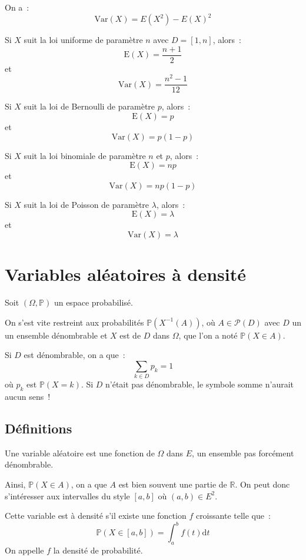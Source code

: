 \documentclass[a4paper, titlepage]{article}
\begin{document}
	\begin{props}
		On a~:
		$$ \mathrm{Var}(X) = E(X^2) - E(X)^2 $$
	\end{props}

	\begin{thm}
		Si $X$ suit la loi uniforme de paramètre $n$ avec $D=[1,n]$, alors~:
		$$ \mathrm{E}(X) = \frac{n+1}{2} $$
		et
		$$ \mathrm{Var}(X) = \frac{n^2-1}{12} $$
	\end{thm}

	\begin{thm}
		Si $X$ suit la loi de Bernoulli de paramètre $p$, alors~:
		$$ \mathrm{E}(X) = p $$
		et
		$$ \mathrm{Var}(X) = p(1-p) $$
	\end{thm}

	\begin{thm}
		Si $X$ suit la loi binomiale de paramètre $n$ et $p$, alors~:
		$$ \mathrm{E}(X) = np $$
		et
		$$ \mathrm{Var}(X) = np(1-p) $$
	\end{thm}

	\begin{thm}
		Si $X$ suit la loi de Poisson de paramètre $\lambda$, alors~:
		$$ \mathrm{E}(X) = \lambda $$
		et
		$$ \mathrm{Var}(X) = \lambda $$
	\end{thm}
	\section{Variables aléatoires à densité}
	Soit $(\Omega,\mathbb{P})$ un espace probabilisé.

	On s'est vite restreint aux probabilités $\mathbb{P}(X^{-1}(A))$, où $A\in\mathcal{P}(D)$ avec $D$ un un ensemble dénombrable et $X$ est de $D$ dans $\Omega$, que l'on a noté $\mathbb{P}(X\in A)$.

	Si $D$ est dénombrable, on a que~:
	$$ \sum_{k\in D} p_k = 1 $$
	où $p_k$ est $\mathbb{P}(X=k)$.
	Si $D$ n'était pas dénombrable, le symbole somme n'aurait aucun sens~!
	\subsection{Définitions}
	\begin{defn}
		Une variable aléatoire est une fonction de $\Omega$ dans $E$, un ensemble pas forcément dénombrable.

		Ainsi, $\mathbb{P}(X\in A)$, on a que $A$ est bien souvent une partie de $\mathbb{R}$.
		On peut donc s'intéresser aux intervalles du style $[a,b]$ où $(a,b)\in E^2$.

		Cette variable est à densité s'il existe une fonction $f$ croissante telle que~:
		$$ \mathbb{P}(X\in[a,b]) = \int^b_a f(t)\mathrm{d}t $$
		On appelle $f$ la densité de probabilité.
	\end{defn}
\end{document}
